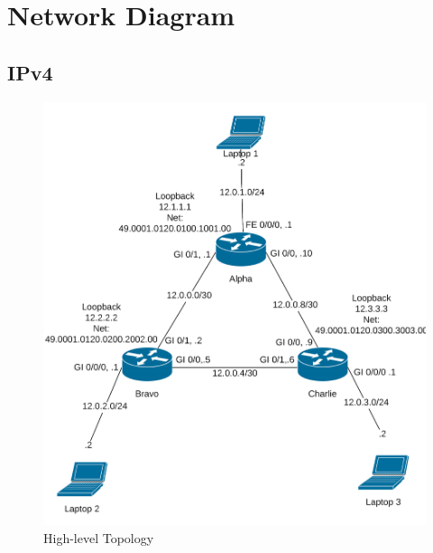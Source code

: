 \chapter{Network Diagram}
\pagebreak
\section{IPv4}
\begin{figure}[!ht]
	\caption{High-level Topology}
	\centering
	\includegraphics[width=\textwidth]{images/IPv4.png}
\end{figure}
\clearpage
